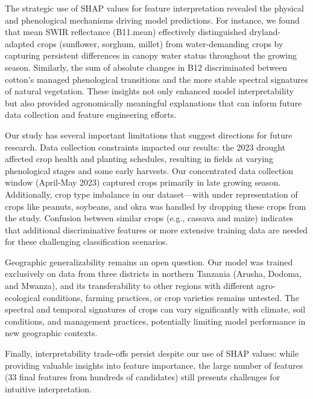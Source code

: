 \documentclass[
  journal,
  twocolumn]{IEEEtran}
\begin{document}
The strategic use of SHAP values for feature interpretation revealed the
physical and phenological mechanisms driving model predictions. For
instance, we found that mean SWIR reflectance (B11.mean) effectively
distinguished dryland-adapted crops (sunflower, sorghum, millet) from
water-demanding crops by capturing persistent differences in canopy
water status throughout the growing season. Similarly, the sum of
absolute changes in B12 discriminated between cotton's managed
phenological transitions and the more stable spectral signatures of
natural vegetation. These insights not only enhanced model
interpretability but also provided agronomically meaningful explanations
that can inform future data collection and feature engineering efforts.

Our study has several important limitations that suggest directions for
future research. Data collection constraints impacted our results: the
2023 drought affected crop health and planting schedules, resulting in
fields at varying phenological stages and some early harvests. Our
concentrated data collection window (April-May 2023) captured crops
primarily in late growing season. Additionally, crop type imbalance in
our dataset---with under representation of crops like peanuts, soybeans,
and okra was handled by dropping these crops from the study. Confusion
between similar crops (e.g., cassava and maize) indicates that
additional discriminative features or more extensive training data are
needed for these challenging classification scenarios.

Geographic generalizability remains an open question. Our model was
trained exclusively on data from three districts in northern Tanzania
(Arusha, Dodoma, and Mwanza), and its transferability to other regions
with different agro-ecological conditions, farming practices, or crop
varieties remains untested. The spectral and temporal signatures of
crops can vary significantly with climate, soil conditions, and
management practices, potentially limiting model performance in new
geographic contexts.

Finally, interpretability trade-offs persist despite our use of SHAP
values: while providing valuable insights into feature importance, the
large number of features (33 final features from hundreds of candidates)
still presents challenges for intuitive interpretation.
\end{document}
